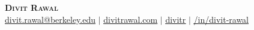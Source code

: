 \begin{center}
    \textbf{\Huge \scshape Divit Rawal} \\
    \vspace{1pt}
    \faEnvelope{} \href{mailto:divit.rawal@berkeley.edu}{\underline{divit.rawal@berkeley.edu}} $|$ 
    \faGlobe{} \href{https://www.divitrawal.com}{\underline{divitrawal.com}} $|$
    \faGithub{} \href{https://www.github.com/divitr}{\underline{divitr}} $|$
    \faLinkedin{} \href{https://www.linkedin.com/in/divit-rawal}{\underline{/in/divit-rawal}}
\end{center}